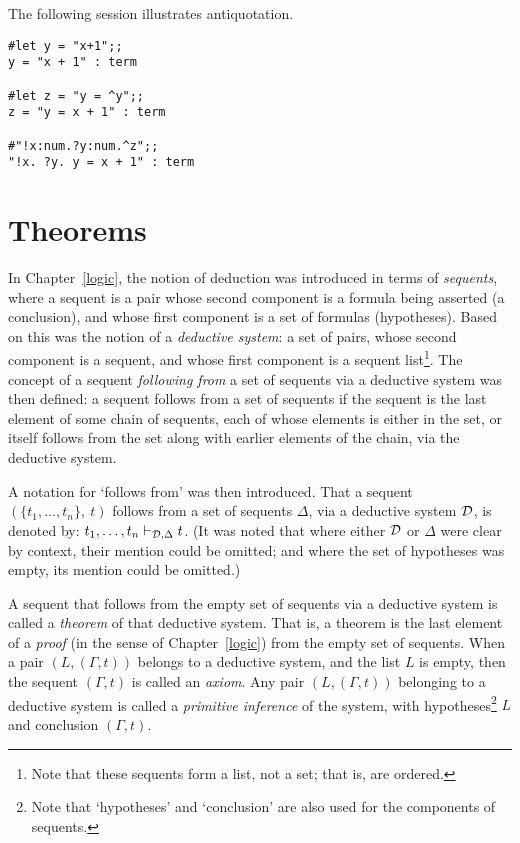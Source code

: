 The following session illustrates antiquotation.

\setcounter{sessioncount}{1}
\begin{session}\begin{verbatim}
#let y = "x+1";;
y = "x + 1" : term

#let z = "y = ^y";;
z = "y = x + 1" : term

#"!x:num.?y:num.^z";;
"!x. ?y. y = x + 1" : term
\end{verbatim}\end{session}


\section{Theorems}
\label{avra_theorems}

In Chapter~\ref{logic}, the notion of deduction was introduced in terms
of {\it sequents\/}, where a sequent
is a pair whose second component is a formula being
asserted (a conclusion),
and whose first component is a set of formulas (hypotheses).
Based on this was the notion of a {\it deductive system\/}: a set of pairs,
whose second component is a sequent, and
whose first component is a sequent list\footnote{Note that these sequents
form a list, not a set; that is, are ordered.}.
The concept of a sequent {\it following from\/}
a set of sequents via a
deductive system was then defined: a sequent follows from a set of sequents if
the sequent
is the last element of some chain of sequents, each of whose
elements is either in the set, or itself follows from the set along with
earlier elements of the chain, via the deductive system.

A notation for `follows from' was then introduced.
That a
sequent $(\{t_1,\ldots,t_n\},\ t)$ follows from
a set of sequents $\Delta$, via a deductive system ${\cal D}$, is
denoted by: $t_1,\ldots,t_n\vdash_{{\cal D},\Delta} t$.
(It was noted that
where either ${\cal D}$ or $\Delta$ were clear by context, their mention
could be omitted; and where the set of hypotheses was empty,
its mention could be omitted.)

A sequent that follows from the empty set of sequents via
a deductive system is called a {\it theorem\/} of that deductive system.
That is, a theorem is the last element of a {\it proof\/} (in the sense
of Chapter~\ref{logic}) from the empty
set of sequents. When a pair $(L,(\Gamma,t))$ belongs to a deductive system,
and the list $L$ is empty,
then the sequent $(\Gamma,t)$ is called an {\it axiom\/}.
Any pair $(L,(\Gamma,t))$ belonging to
a deductive system is called a {\it primitive inference\/}
of the system, with hypotheses\footnote{Note that
`hypotheses' and `conclusion' are also used for the components
of sequents.} $L$ and
conclusion $(\Gamma,t)$.

